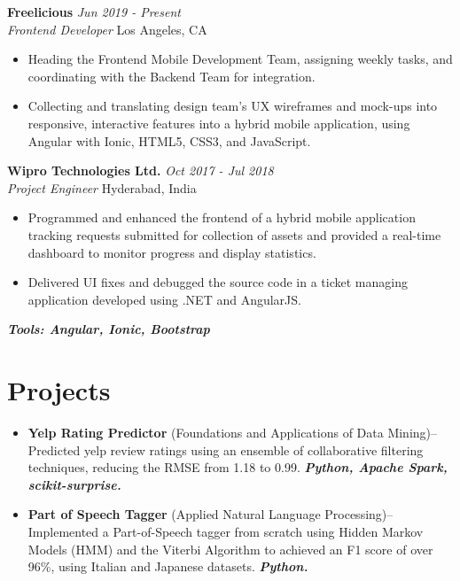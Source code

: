 \documentclass[letterpaper,10pt]{article}
\newcommand{\organization}[4]{
    \vspace{1.5pt}
    \textbf{#1} \hfill{\emph{#2}} \\
    \emph{#3} \hfill{#4} \\
    \vspace{3pt}
}
\newcommand{\pro}[4]{
    \item \textbf{#1} {#2}--{#3} \textbf{\textit{#4}}
}
\newcommand{\bulletsBegin}{
    \vspace{1pt}
    \begin{minipage}{17.6cm}
    \begin{itemize}[leftmargin=0.6cm]
    \setlength\itemsep{-0.1em}
}
\newcommand{\bulletsEnd}{
    \end{itemize}\vspace{0pt}
    \end{minipage}
}
\begin{document}
        \organization{Freelicious}{Jun 2019 - Present}
        {Frontend Developer}{Los Angeles, CA}
        \bulletsBegin
            \item Heading the Frontend Mobile Development Team, assigning weekly tasks, and coordinating with the Backend Team for integration.
            \vspace{-2pt}
            \item Collecting and translating design team's UX wireframes and mock-ups into responsive, interactive features into a hybrid mobile application, using Angular with Ionic, HTML5, CSS3, and JavaScript.
        \bulletsEnd

        \organization{Wipro Technologies Ltd.}{Oct 2017 - Jul 2018}
        {Project Engineer}{Hyderabad, India}
        \bulletsBegin
            \item Programmed and enhanced the frontend of a hybrid mobile application tracking requests submitted for collection of assets and provided a real-time dashboard to monitor progress and display statistics.
            \vspace{-2pt}
            \item Delivered UI fixes and debugged the source code in a ticket managing application developed using .NET and AngularJS.
        \bulletsEnd
        \vspace{-2pt}
        \textbf{\textit{Tools: Angular, Ionic, Bootstrap}}

    \section{Projects}

    
        \bulletsBegin
            \vspace{-3pt}
        \pro{Yelp Rating Predictor}{(Foundations and Applications of Data Mining)}
            {Predicted yelp review ratings using an ensemble of collaborative filtering techniques, reducing the RMSE from 1.18 to 0.99.}
            {Python, Apache Spark, scikit-surprise.}
        \pro{Part of Speech Tagger}{(Applied Natural Language Processing)}
            {Implemented a Part-of-Speech tagger from scratch using Hidden Markov Models (HMM) and the Viterbi Algorithm to achieved an F1 score of over 96\%, using Italian and Japanese datasets.}
            {Python.}
        
        \bulletsEnd
\end{document}
